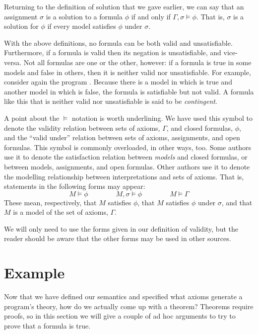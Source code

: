 \noindent
Returning to the definition of solution that we gave earlier,
we can say that an assignment $\sigma$
is a solution\label{gi:solution2} to a formula $\phi$
if and only if $\Gamma, \sigma \models \phi$.
That is,
$\sigma$ is a solution for $\phi$
if every model satisfies $\phi$ under $\sigma$.

With the above definitions,
no formula can be both valid and unsatisfiable.
Furthermore, if a formula is valid
then its negation is unsatisfiable,
and vice-versa.
Not all formulas are one or the other, however:
if a formula is true in some models and false in others,
then it is neither valid nor unsatisfiable.
For example,
consider again the program \mbox{}.
Because there is a model in which  is true
and another model in which  is false,
the formula  is satisfiable but not valid.
A formula like this that is neither valid nor unsatisfiable
is said to be \emph{contingent\label{gi:contingent}}.

A point about the $\models$ notation is worth underlining.
We have used this symbol to denote the validity relation between
sets of axioms, $\Gamma$, and closed formulas, $\phi$,
and the ``valid under'' relation between
sets of axioms, assignments, and open formulas.
This symbol is commonly overloaded, in other ways, too.
Some authors use it to denote
the satisfaction relation between \emph{models} and closed formulas,
or between models, assignments, and open formulas.
Other authors use it to denote
the modelling relationship between interpretations and sets of axioms.
That is, statements in the following forms may appear:
\[
M \models \phi
\qquad\qquad
M, \sigma \models \phi
\qquad\qquad
M \models \Gamma
\]
These mean, respectively,
that $M$ satisfies $\phi$,
that $M$ satisfies $\phi$ under $\sigma$,
and that $M$ is a model of the set of axioms, $\Gamma$.

We will only need to use the forms given in our definition of validity,
but the reader should be aware that
the other forms may be used in other sources.


\section{Example}
\label{sec:reasoning}

Now that we have defined our semantics
and specified what axioms generate a program's theory,
how do we actually come up with a theorem?
Theorems require proofs,
so in this section we will give a couple of ad hoc arguments
to try to prove that a formula is true.

